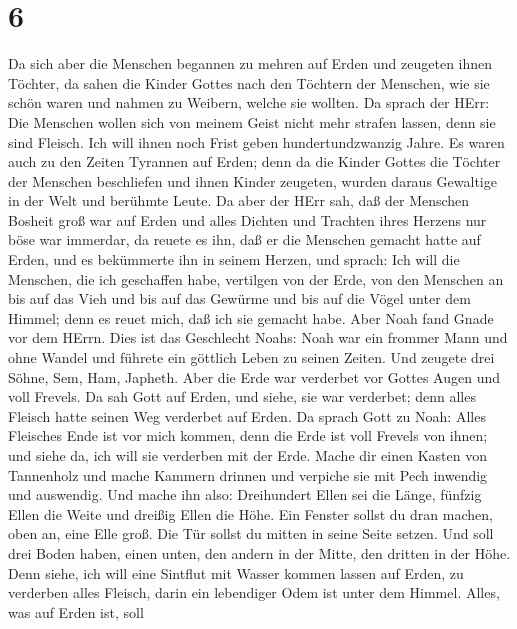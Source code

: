 \hypertarget{section-5}{%
\section{6}\label{section-5}}

 Da sich aber die Menschen begannen zu mehren auf Erden und
zeugeten ihnen Töchter,  da sahen die Kinder Gottes nach den
Töchtern der Menschen, wie sie schön waren und nahmen zu Weibern, welche
sie wollten.  Da sprach der HErr: Die Menschen wollen sich
von meinem Geist nicht mehr strafen lassen, denn sie sind Fleisch. Ich
will ihnen noch Frist geben hundertundzwanzig Jahre.  Es
waren auch zu den Zeiten Tyrannen auf Erden; denn da die Kinder Gottes
die Töchter der Menschen beschliefen und ihnen Kinder zeugeten, wurden
daraus Gewaltige in der Welt und berühmte Leute.  Da aber
der HErr sah, daß der Menschen Bosheit groß war auf Erden und alles
Dichten und Trachten ihres Herzens nur böse war immerdar, 
da reuete es ihn, daß er die Menschen gemacht hatte auf Erden, und es
bekümmerte ihn in seinem Herzen,  und sprach: Ich will die
Menschen, die ich geschaffen habe, vertilgen von der Erde, von den
Menschen an bis auf das Vieh und bis auf das Gewürme und bis auf die
Vögel unter dem Himmel; denn es reuet mich, daß ich sie gemacht habe.
 Aber Noah fand Gnade vor dem HErrn.  Dies ist
das Geschlecht Noahs: Noah war ein frommer Mann und ohne Wandel und
führete ein göttlich Leben zu seinen Zeiten.  Und zeugete
drei Söhne, Sem, Ham, Japheth.  Aber die Erde war verderbet
vor Gottes Augen und voll Frevels.  Da sah Gott auf Erden,
und siehe, sie war verderbet; denn alles Fleisch hatte seinen Weg
verderbet auf Erden.  Da sprach Gott zu Noah: Alles
Fleisches Ende ist vor mich kommen, denn die Erde ist voll Frevels von
ihnen; und siehe da, ich will sie verderben mit der Erde. 
Mache dir einen Kasten von Tannenholz und mache Kammern drinnen und
verpiche sie mit Pech inwendig und auswendig.  Und mache
ihn also: Dreihundert Ellen sei die Länge, fünfzig Ellen die Weite und
dreißig Ellen die Höhe.  Ein Fenster sollst du dran machen,
oben an, eine Elle groß. Die Tür sollst du mitten in seine Seite setzen.
Und soll drei Boden haben, einen unten, den andern in der Mitte, den
dritten in der Höhe.  Denn siehe, ich will eine Sintflut
mit Wasser kommen lassen auf Erden, zu verderben alles Fleisch, darin
ein lebendiger Odem ist unter dem Himmel. Alles, was auf Erden ist, soll
